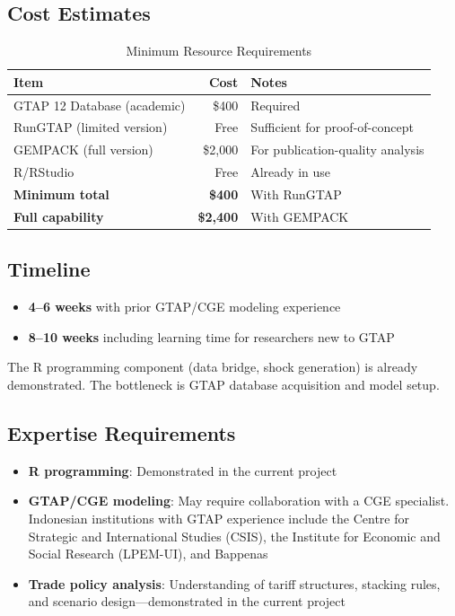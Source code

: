 \documentclass[12pt,a4paper]{article}
\begin{document}
\subsection{Cost Estimates}

\begin{table}[htbp]
\centering
\caption{Minimum Resource Requirements}
\begin{tabular}{lrl}
\toprule
\textbf{Item} & \textbf{Cost} & \textbf{Notes} \\
\midrule
GTAP 12 Database (academic)   & \$400  & Required \\
RunGTAP (limited version)     & Free   & Sufficient for proof-of-concept \\
GEMPACK (full version)        & \$2,000 & For publication-quality analysis \\
R/RStudio                     & Free   & Already in use \\
\midrule
\textbf{Minimum total}        & \textbf{\$400} & With RunGTAP \\
\textbf{Full capability}      & \textbf{\$2,400} & With GEMPACK \\
\bottomrule
\end{tabular}
\label{tab:costs}
\end{table}

\subsection{Timeline}

\begin{itemize}
    \item \textbf{4--6 weeks} with prior GTAP/CGE modeling experience
    \item \textbf{8--10 weeks} including learning time for researchers new to GTAP
\end{itemize}

\noindent The R programming component (data bridge, shock generation) is already demonstrated. The bottleneck is GTAP database acquisition and model setup.

\subsection{Expertise Requirements}

\begin{itemize}
    \item \textbf{R programming}: Demonstrated in the current project
    \item \textbf{GTAP/CGE modeling}: May require collaboration with a CGE specialist. Indonesian institutions with GTAP experience include the Centre for Strategic and International Studies (CSIS), the Institute for Economic and Social Research (LPEM-UI), and Bappenas
    \item \textbf{Trade policy analysis}: Understanding of tariff structures, stacking rules, and scenario design---demonstrated in the current project
\end{itemize}
\end{document}
